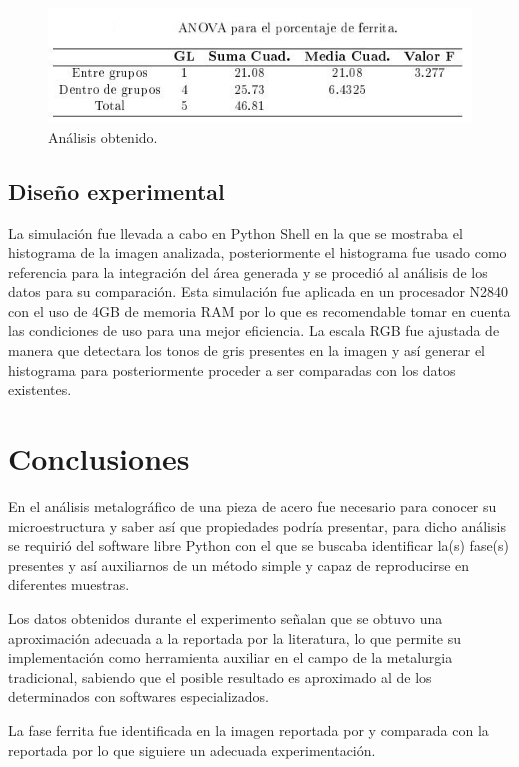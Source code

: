 \documentclass[12pt,twocolumn]{article}
\begin{document}
\begin{figure}[H]
  \centering\includegraphics[scale=0.6]{anova2.jpg}
  \caption{An\'alisis obtenido.}
  \label{fig}
\end{figure}
\subsection{Dise\~no experimental}
La simulaci\'on fue llevada a cabo en Python Shell en la que se mostraba el histograma de la imagen analizada, posteriormente el histograma fue usado como referencia para la integraci\'on del \'area generada y se procedi\'o al an\'alisis de los datos para su comparaci\'on. Esta simulaci\'on fue aplicada en un procesador  N2840 con el uso de 4GB de memoria RAM por lo que es recomendable tomar en cuenta las condiciones de uso para una mejor eficiencia.
La escala RGB fue ajustada de manera que detectara los tonos de gris presentes en la imagen y as\'i generar el histograma para posteriormente proceder a ser comparadas con los datos existentes.

\section{Conclusiones}

En el an\'alisis metalogr\'afico de una pieza de acero fue necesario para conocer su microestructura y saber as\'i que propiedades podr\'ia presentar, para dicho an\'alisis se requiri\'o del software libre Python con el que se buscaba identificar la(s) fase(s) presentes y as\'i auxiliarnos de un m\'etodo simple y capaz de reproducirse en diferentes muestras.

Los datos obtenidos durante el experimento se\~nalan que se obtuvo una aproximaci\'on adecuada a la reportada por la literatura, lo que permite su implementaci\'on como herramienta auxiliar en el campo de la metalurgia tradicional, sabiendo que el posible resultado es aproximado al de los determinados con softwares especializados.

La fase ferrita fue identificada en la imagen reportada por \cite{metal} y comparada con la reportada por \cite{ref2} lo que siguiere un adecuada experimentaci\'on.
\end{document}
